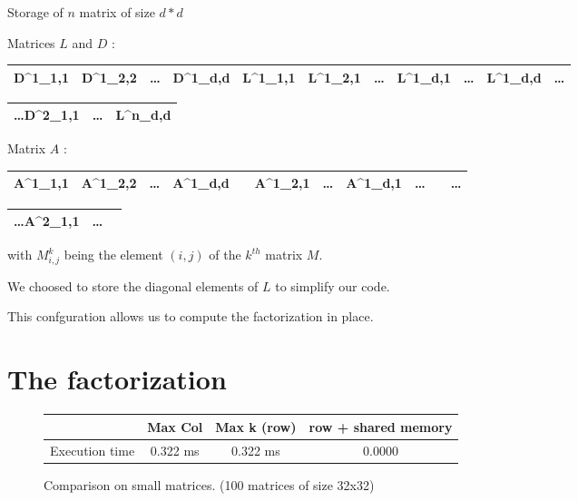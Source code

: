 \documentclass[compress,xcolor=table]{beamer}
\begin{document}
\begin{frame}{}
	Storage of $n$ matrix of size $d*d$

	Matrices $L$ and $D$ :
	\begin{tabular}{|C|C|C|C||C|C|C|C|C|C||C}
		\hline
		D^1_{1,1} & D^1_{2,2} & \dots & D^1_{d,d} & L^1_{1,1} & L^1_{2,1} &
		\dots & L^1_{d,1} & \dots & L^1_{d,d} & \dots\\
		\hline
	\end{tabular}
	\begin{tabular}{C|C|C|}
		\hline
		\dots D^2_{1,1} &  \dots & L^n_{d,d} \\
		\hline
	\end{tabular}

	Matrix $A$ :
	\begin{tabular}{|C|C|C|C||C|C|C|C|C|C||C}
		\hline
		A^1_{1,1} & A^1_{2,2} & \dots & A^1_{d,d} & \emptyset & A^1_{2,1} &
		\dots & A^1_{d,1} & \dots & \emptyset & \dots\\
		\hline
	\end{tabular}
	\begin{tabular}{C|C|C|}
		\hline
		\dots A^2_{1,1} &  \dots & \emptyset \\
		\hline
	\end{tabular}

	with $M^k_{i,j}$ being the element $(i,j)$ of the $k^{th}$ matrix $M$.

	We choosed to store the diagonal elements of $L$ to simplify our code.

	This confguration allows us to compute the factorization in place.
\end{frame}


\section{The factorization}

\begin{frame}{}
	
	\begin{figure}
		\begin{tabular}{c|c|c|c}
			& Max Col & Max k (row) & row + shared memory
			\\
			\hline
			Execution time & 0.322 ms &0.322 ms & 0.0000 \\
		\end{tabular}
	
	\caption{Comparison on small matrices. (100 matrices of size 32x32)}
	\end{figure}

\end{frame}
\end{document}

